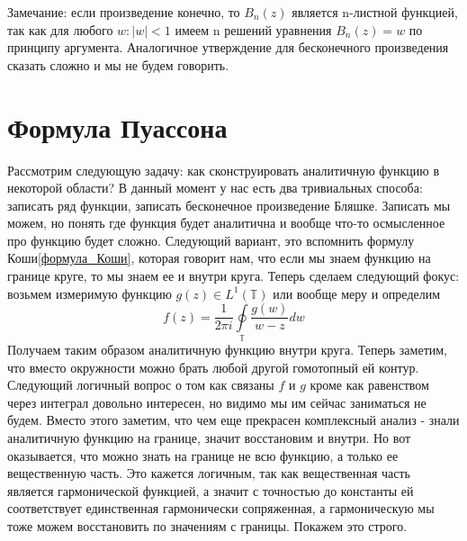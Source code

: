 \documentclass[12pt,a4paper]{article} %
\begin{document}
	Замечание: если произведение конечно, то $B_n(z)$ является n-листной функцией, так как для любого $w:|w|<1$ имеем n решений уравнения $B_n(z)=w$ по принципу аргумента. Аналогичное утверждение для бесконечного произведения сказать сложно и мы не будем говорить.
	\section{Формула Пуассона}
	Рассмотрим следующую задачу: как сконструировать аналитичную функцию в некоторой области? В данный момент у нас есть два тривиальных способа: записать ряд функции, записать бесконечное произведение Бляшке. Записать мы можем, но понять где функция будет аналитична и вообще что-то осмысленное про функцию будет сложно. Следующий вариант, это вспомнить формулу Коши\eqref{формула_Коши}, которая говорит нам, что если мы знаем функцию на границе круге, то мы знаем ее и внутри круга. Теперь сделаем следующий фокус: возьмем измеримую функцию $g(z)\in L^1(\mathbb{T})$ или вообще меру и определим
	$$f(z)=\frac{1}{2\pi i}\oint\limits_{\mathbb{T}}\frac{g(w)}{w-z}dw$$
	Получаем таким образом аналитичную функцию внутри круга. Теперь заметим, что вместо окружности можно брать любой другой гомотопный ей контур. Следующий логичный вопрос о том как связаны $f$ и $g$ кроме как равенством через интеграл довольно интересен, но видимо мы им сейчас заниматься не будем. Вместо этого заметим, что чем еще прекрасен комплексный анализ - знали аналитичную функцию на границе, значит восстановим и внутри. Но вот оказывается, что можно знать на границе не всю функцию, а только ее вещественную часть. Это кажется логичным, так как вещественная часть является гармонической функцией, а значит с точностью до константы ей соответствует единственная гармонически сопряженная, а гармоническую мы тоже можем восстановить по значениям с границы. Покажем это строго.
	
\end{document}
